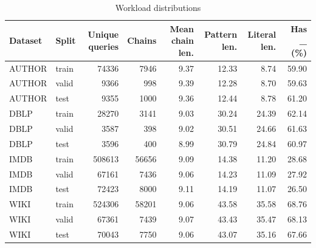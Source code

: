 \begin{table}[H]
\centering
\small
\setlength{\tabcolsep}{5pt}
\caption{Workload distributions}
\label{tab:A_distributions}
\begin{tabular}{@{}llrrrrrr@{}}
\toprule
Dataset & Split & Unique queries & Chains & Mean chain len. & Pattern len. & Literal len. & Has \_ (\%) \\
\midrule
AUTHOR & train & 74336 & 7946 & 9.37 & 12.33 & 8.74 & 59.90 \\
AUTHOR & valid & 9366 & 998 & 9.39 & 12.28 & 8.70 & 59.63 \\
AUTHOR & test & 9355 & 1000 & 9.36 & 12.44 & 8.78 & 61.20 \\
DBLP & train & 28270 & 3141 & 9.03 & 30.24 & 24.39 & 62.14 \\
DBLP & valid & 3587 & 398 & 9.02 & 30.51 & 24.66 & 61.63 \\
DBLP & test & 3596 & 400 & 8.99 & 30.79 & 24.84 & 60.97 \\
IMDB & train & 508613 & 56656 & 9.09 & 14.38 & 11.20 & 28.68 \\
IMDB & valid & 67161 & 7436 & 9.06 & 14.23 & 11.09 & 27.92 \\
IMDB & test & 72423 & 8000 & 9.11 & 14.19 & 11.07 & 26.50 \\
WIKI & train & 524306 & 58201 & 9.06 & 43.58 & 35.58 & 68.76 \\
WIKI & valid & 67361 & 7439 & 9.07 & 43.43 & 35.47 & 68.13 \\
WIKI & test & 70043 & 7750 & 9.06 & 43.07 & 35.16 & 67.66 \\
\bottomrule
\end{tabular}
\end{table}
